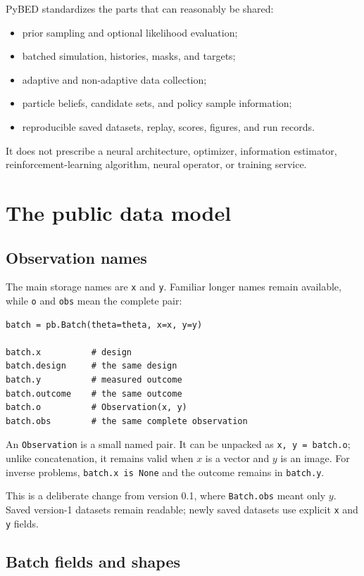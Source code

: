\documentclass[11pt]{article}
\begin{document}
PyBED standardizes the parts that can reasonably be shared:
\begin{itemize}
  \item prior sampling and optional likelihood evaluation;
  \item batched simulation, histories, masks, and targets;
  \item adaptive and non-adaptive data collection;
  \item particle beliefs, candidate sets, and policy sample information;
  \item reproducible saved datasets, replay, scores, figures, and run records.
\end{itemize}
It does not prescribe a neural architecture, optimizer, information estimator,
reinforcement-learning algorithm, neural operator, or training service.

\section{The public data model}

\subsection{Observation names}

The main storage names are \texttt{x} and \texttt{y}. Familiar longer names remain
available, while \texttt{o} and \texttt{obs} mean the complete pair:
\begin{lstlisting}
batch = pb.Batch(theta=theta, x=x, y=y)

batch.x          # design
batch.design     # the same design
batch.y          # measured outcome
batch.outcome    # the same outcome
batch.o          # Observation(x, y)
batch.obs        # the same complete observation
\end{lstlisting}
An \texttt{Observation} is a small named pair. It can be unpacked as
\texttt{x, y = batch.o}; unlike concatenation, it remains valid when $x$ is a
vector and $y$ is an image. For inverse problems, \texttt{batch.x is None} and
the outcome remains in \texttt{batch.y}.

This is a deliberate change from version 0.1, where \texttt{Batch.obs} meant only
$y$. Saved version-1 datasets remain readable; newly saved datasets use explicit
\texttt{x} and \texttt{y} fields.

\subsection{Batch fields and shapes}
\end{document}
